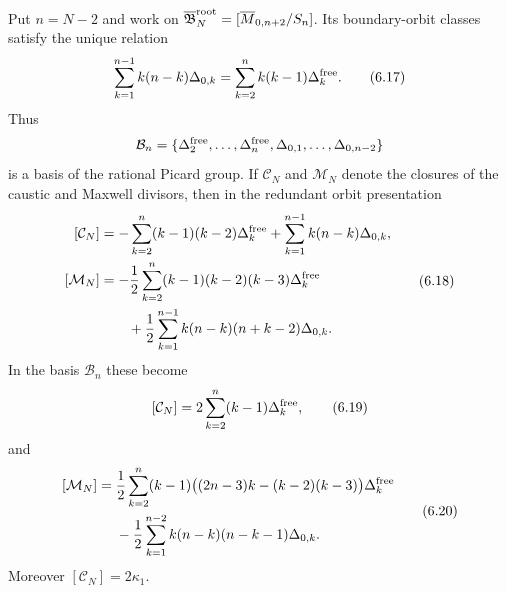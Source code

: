 \begin{theorem}
\label{thm:caustic-maxwell-boundary}
Put $n=N-2$ and work on
$\overline{\mathfrak B}^{\rm root}_N=[\overline M_{0,n+2}/S_n]$.
Its boundary-orbit classes satisfy the unique relation
\[
 \sum_{k=1}^{n-1}k(n-k)\Delta_{0,k}
 =\sum_{k=2}^{n}k(k-1)\Delta_k^{\rm free}.           \tag{6.17}
\]
Thus
\[
 \mathcal B_n=\{\Delta_2^{\rm free},\ldots,
 \Delta_n^{\rm free},\Delta_{0,1},\ldots,\Delta_{0,n-2}\}
\]
is a basis of the rational Picard group.  If $\mathcal C_N$ and
$\mathcal M_N$ denote the closures of the caustic and Maxwell divisors, then
in the redundant orbit presentation
\[
\begin{aligned}
 [\mathcal C_N]
  &=-\sum_{k=2}^{n}(k-1)(k-2)\Delta_k^{\rm free}
    +\sum_{k=1}^{n-1}k(n-k)\Delta_{0,k},\\
 [\mathcal M_N]
  &=-\frac12\sum_{k=2}^{n}(k-1)(k-2)(k-3)
                     \Delta_k^{\rm free}\\
  &\qquad+\frac12\sum_{k=1}^{n-1}k(n-k)(n+k-2)\Delta_{0,k}.
\end{aligned}                                                   \tag{6.18}
\]
In the basis $\mathcal B_n$ these become
\[
 [\mathcal C_N]=2\sum_{k=2}^{n}(k-1)\Delta_k^{\rm free},       \tag{6.19}
\]
and
\[
\begin{aligned}
 [\mathcal M_N]
  ={}&\frac12\sum_{k=2}^{n}(k-1)
       \bigl((2n-3)k-(k-2)(k-3)\bigr)\Delta_k^{\rm free}\\
    &-\frac12\sum_{k=1}^{n-2}k(n-k)(n-k-1)\Delta_{0,k}.
\end{aligned}                                                   \tag{6.20}
\]
Moreover $[\mathcal C_N]=2\kappa_1$.
\end{theorem}

